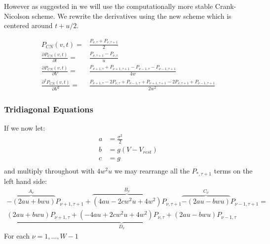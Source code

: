 \documentclass[10pt]{article}
\begin{document}
However as suggested in \cite{PaninskiHaithSzirtes} we will use the
computationally more stable Crank-Nicolson scheme\cite{press}.  
We rewrite the derivatives using the new scheme which is centered around $t +
u/2$.

\begin{eqnarray}
    P_{CN}(v,t) =& \frac{P_{\nu,\tau} + P_{\nu,\tau + 1}}{2} \\
    \frac{\partial P_{CN}(v,t)}{\partial t} =& \frac{P_{\nu,\tau +1 } -
    P_{\nu,\tau}}{u} \\
    \frac{\partial P_{CN}(v,t)}{\partial V} =&
    \frac{P_{\nu +1,\tau } + P_{\nu +1,\tau +1 } -
    P_{\nu - 1,\tau } - P_{\nu -1,\tau +1}} 
    {4w} \\
    \frac{\partial^2 P_{CN}(v,t)}{\partial V^2} =&
    \frac{P_{\nu+1,\tau} - 2 P_{\nu,\tau} + P_{\nu-1,\tau} +
    P_{\nu+1,\tau+1} - 2 P_{\nu,\tau+1} + P_{\nu-1,\tau+1}}
    {2w^2} 
\end{eqnarray}

\subsubsection{Tridiagonal Equations}

If we now let:
\begin{align*}
a &= \frac{\sigma^2}{2} \\
b &= g(V - V_{rest}) \\
c &= g \\
\end{align*}
and multiply throughout with $4w^2u$
we may rearrange all the $P_{*,\tau+1} $ terms on the left hand side:
\begin{multline}
    \overbrace{-(2au+bwu)}^{A_\nu} P_{\nu+1,\tau+1} + 
    \overbrace{(4au - 2cw^2u + 4w^2)}^{B_\nu} P_{\nu,\tau+1}
    \overbrace{-(2au-bwu)}^{C_\nu} P_{\nu-1,\tau+1}
    =  \\
    \underbrace{(2au+bwu) P_{\nu+1,\tau} +  
    (-4au +2cw^2u + 4w^2) P_{\nu,\tau} + 
    (2au-bwu) P_{\nu-1,\tau}}_{D_{\nu}}
    \label{rearrange}
\end{multline}
For each $ \nu = 1 , \dots , W-1 $
\end{document}
